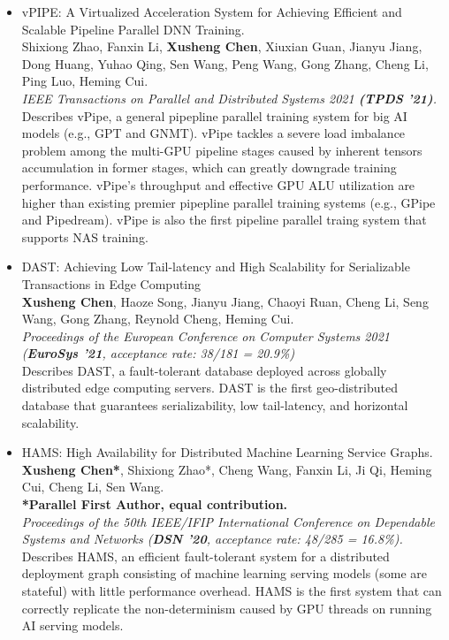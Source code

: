 \documentclass[a4paper,7pt]{article} %
\newcommand{\authors}[1]{{\small \fontfamily{cmss}\selectfont #1}}
\newcommand{\conference}[1]{\textit{\small \fontfamily{cmss}\selectfont #1}}
\newcommand{\info}[1]{{\footnotesize \fontfamily{cmss}\selectfont #1}}
\begin{document}
\begin{itemize}
    \item {vPIPE: A Virtualized Acceleration System for Achieving Efficient and Scalable Pipeline Parallel DNN Training.} \\
    \authors{Shixiong Zhao, Fanxin Li, \textbf{Xusheng Chen}, Xiuxian Guan, Jianyu Jiang, Dong Huang, Yuhao Qing, Sen Wang, Peng Wang, Gong Zhang, Cheng Li, Ping Luo, Heming Cui.} \\
    \conference{IEEE Transactions on Parallel and Distributed Systems 2021 \textbf{(TPDS '21)}.}  \\
    \info{Describes vPipe, a general pipepline parallel training system for big AI models (e.g., GPT and GNMT). vPipe tackles a severe load imbalance problem among the multi-GPU pipeline stages caused by inherent tensors accumulation in former stages, which can greatly downgrade training performance. vPipe's throughput and effective GPU ALU utilization are higher than existing premier pipepline parallel training systems (e.g., GPipe and Pipedream). vPipe is also the first pipeline parallel traing system that supports NAS training.}\\


    \item {DAST: Achieving Low Tail-latency and High Scalability for Serializable Transactions in Edge Computing} \\
    \authors{\textbf{Xusheng Chen}, Haoze Song, Jianyu Jiang, Chaoyi Ruan, Cheng Li, Seng Wang, Gong Zhang, Reynold Cheng, Heming Cui.} \\
    \conference{Proceedings of the European Conference on Computer Systems 2021 (\textbf{EuroSys '21}, acceptance rate: 38/181 = 20.9\%)} \\
    \info{Describes DAST, a fault-tolerant database deployed across
     globally distributed edge computing servers. DAST is the first
     geo-distributed database that guarantees serializability, low
     tail-latency, and horizontal scalability.} \\


    \item {HAMS: High Availability for Distributed Machine Learning Service Graphs.} \\ 
    \authors{\textbf{Xusheng Chen*}, Shixiong Zhao*, Cheng Wang, Fanxin Li, Ji Qi, Heming Cui, Cheng Li, Sen Wang.}\\
    \authors{\textbf{*Parallel First Author, equal contribution.}} \\
    \conference{Proceedings of the 50th IEEE/IFIP International Conference on Dependable Systems and Networks (\textbf{DSN '20}, acceptance rate: 48/285 = 16.8\%).}\\
    \info{Describes HAMS, an efficient fault-tolerant system for a distributed
    deployment graph consisting of machine learning serving models (some are
    stateful) with little performance overhead. HAMS is the first system that
    can correctly replicate the non-determinism caused by GPU threads on running
    AI serving models.} \\
  


\end{itemize}
\end{document}

